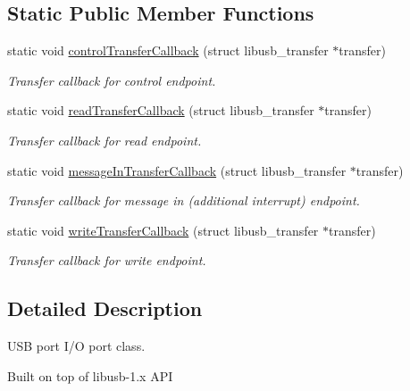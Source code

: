 \subsection*{Static Public Member Functions}
\begin{DoxyCompactItemize}
\item 
static void \hyperlink{classmdt_usb_port_a84ddd2d0bf77b4db60358846c7da4853}{controlTransferCallback} (struct libusb\_\-transfer $\ast$transfer)
\begin{DoxyCompactList}\small\item\em Transfer callback for control endpoint. \end{DoxyCompactList}\item 
static void \hyperlink{classmdt_usb_port_ab4f1f0456c84f954604b192f6085c3f2}{readTransferCallback} (struct libusb\_\-transfer $\ast$transfer)
\begin{DoxyCompactList}\small\item\em Transfer callback for read endpoint. \end{DoxyCompactList}\item 
static void \hyperlink{classmdt_usb_port_ae8932368e2777356695ab69f6ed08f41}{messageInTransferCallback} (struct libusb\_\-transfer $\ast$transfer)
\begin{DoxyCompactList}\small\item\em Transfer callback for message in (additional interrupt) endpoint. \end{DoxyCompactList}\item 
static void \hyperlink{classmdt_usb_port_af910071a5a5c401cd20cee3519120cc2}{writeTransferCallback} (struct libusb\_\-transfer $\ast$transfer)
\begin{DoxyCompactList}\small\item\em Transfer callback for write endpoint. \end{DoxyCompactList}\end{DoxyCompactItemize}


\subsection{Detailed Description}
USB port I/O port class. 

Built on top of libusb-\/1.x API

